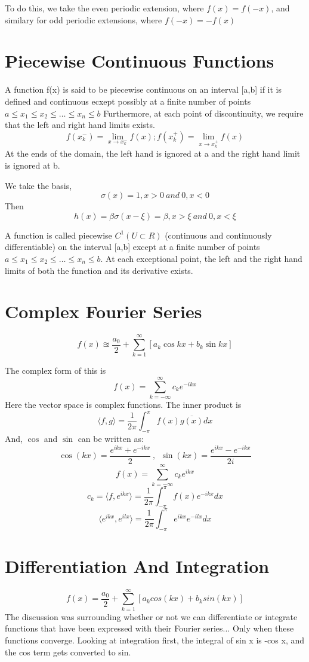 \documentclass{report}
\begin{document}
To do this, we take the even periodic extension, where $f(x) = f(-x)$, and similary for odd periodic extensions, where $f(-x) = -f(x)$ 
\section{Piecewise Continuous Functions}

\begin{definition}
   A function f(x) is said to be piecewise continuous on an interval [a,b] if it is defined and continuous ecxept possibly at a finite number of points $a\leq x_1 \leq x_2 \leq \dots \leq x_n \leq b$ Furthermore, at each point of discontinuity, we require that the left and right hand limits exists. 
   \[
      f(x_k^-) = \lim_{x \rightarrow x_k^-} f(x); f(x_k^+) = \lim_{x\rightarrow x_k^+} f(x)
   \]
   At the ends of the domain, the left hand is ignored at a and the right hand limit is ignored at b.
\end{definition}
We take the basis,
\[
   \sigma(x) = 1, x>0 \ and \ 0, x<0
\]
Then
\[
	h(x) = \beta \sigma(x - \xi) = \beta, x> \xi \ and \ 0, x<\xi
\]
\begin{definition}[Piecewise $C^1$]
   A function is called piecewise $C^1(U \subset R)$ (continuous and continuously differentiable) on the interval [a,b] except at a finite number of points $a\leq x_1 \leq x_2 \leq \dots \leq x_n \leq b$. At each exceptional point, the left and the right hand limits of both the function and its derivative exists.
\end{definition}
\section{Complex Fourier Series}
\[
   f(x) \approxeq \frac{a_0}{2}+\sum_{k=1}^{\infty}[a_k \cos{kx} + b_k \sin{kx}]
\]

The complex form of this is
\[
   f(x) = \sum_{k=-\infty}^{\infty} c_k e^{-ikx}
\]
Here the vector space is complex functions.
The inner product is 
\[
   \langle f,g \rangle = \frac{1}{2\pi}\int_{-\pi}^{\pi} f(x) \overline{g(x)} dx
\]
And, $\cos$ and $\sin$ can be written as:
\[
\cos{(kx)} = \frac{e^{ikx} + e^{-ikx}}{2} \ , \ \ \sin{(kx)} = \frac{e^{ikx} - e^{-ikx}}{2i}
\]
\[
   f(x) = \sum_{k=-\infty}^{\infty} c_k e^{ikx}
\]
\[
   c_k = \langle f, e^{ikx} \rangle = \frac{1}{2\pi} \int_{-\pi}^{\pi} f(x) e^{-ikx}dx
\]
\[
   \langle e^{ikx},e^{ilx} \rangle = \frac{1}{2\pi} \int_{-\pi}^\pi e^{ikx} e^{-ilx}dx
\]
\section{Differentiation And Integration} %
\[
   f(x) = \frac{a_0}{2} + \sum_{k=1}^{\infty} [a_k cos(kx) + b_k sin(kx)]
\]
The discussion was surrounding whether or not we can differentiate or integrate functions that have been expressed with their Fourier series... Only when these functions converge. 
Looking at integration first, the integral of sin x is -cos x, and the cos term gets converted to sin. 
\end{document}
